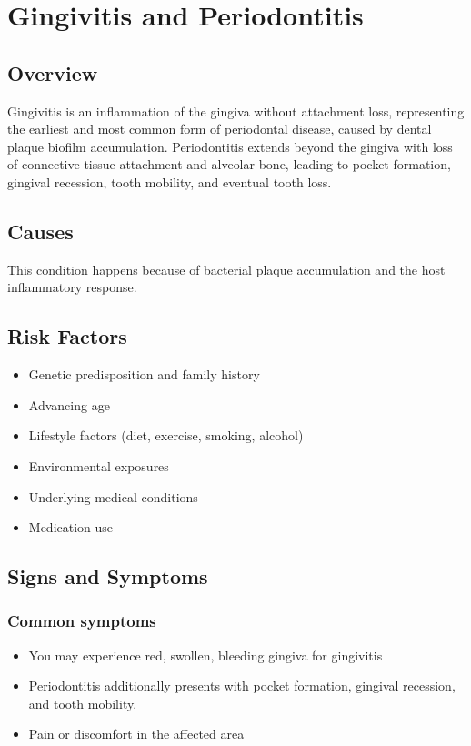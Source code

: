 \chapter{Gingivitis and Periodontitis}
\label{sec:Gingivitis and Periodontitis}

\section{Overview}
Gingivitis is an inflammation of the gingiva without attachment loss, representing the earliest and most common form of periodontal disease, caused by dental plaque biofilm accumulation. Periodontitis extends beyond the gingiva with loss of connective tissue attachment and alveolar bone, leading to pocket formation, gingival recession, tooth mobility, and eventual tooth loss.
\section{Causes}
This condition happens because of bacterial plaque accumulation and the host inflammatory response.     
\section{Risk Factors}

\begin{itemize}[noitemsep]
  \item Genetic predisposition and family history
  \item Advancing age
  \item Lifestyle factors (diet, exercise, smoking, alcohol)
  \item Environmental exposures
  \item Underlying medical conditions
  \item Medication use
\end{itemize}
\section{Signs and Symptoms}

\subsection{Common symptoms}
\begin{itemize}[noitemsep]
  \item You may experience red, swollen, bleeding gingiva for gingivitis
  \item Periodontitis additionally presents with pocket formation, gingival recession, and tooth mobility.
  \item Pain or discomfort in the affected area
  \end{itemize}

